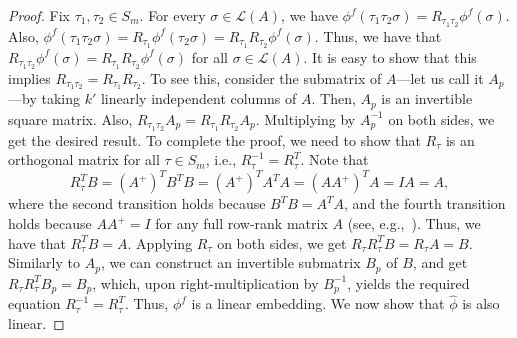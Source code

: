 \documentclass[prodmode,acmec]{ec-acmsmall}
\newcommand{\calL}{{\mathcal{L}}}
\newcommand{\rank}{{\calL(A)}}
\begin{document}
\begin{proof}
Fix $\tau_1,\tau_2 \in S_m$. For every $\sigma \in \rank$, we have $\phi^f(\tau_1 \tau_2 \sigma) = R_{\tau_1 \tau_2} \phi^f(\sigma)$. Also, $\phi^f(\tau_1 \tau_2 \sigma) = R_{\tau_1} \phi^f(\tau_2 \sigma) = R_{\tau_1}R_{\tau_2} \phi^f(\sigma)$. Thus, we have that $R_{\tau_1 \tau_2} \phi^f(\sigma) = R_{\tau_1} R_{\tau_2} \phi^f(\sigma)$ for all $\sigma \in \rank$. It is easy to show that this implies $R_{\tau_1 \tau_2} = R_{\tau_1} R_{\tau_2}$. To see this, consider the submatrix of $A$---let us call it $A_p$---by taking $k'$ linearly independent columns of $A$. Then, $A_p$ is an invertible square matrix. Also, $R_{\tau_1 \tau_2} A_p = R_{\tau_1} R_{\tau_2} A_p$. Multiplying by $A_p^{-1}$ on both sides, we get the desired result. To complete the proof, we need to show that $R_{\tau}$ is an orthogonal matrix for all $\tau \in S_m$, i.e., $R_{\tau}^{-1} = R_{\tau}^T$. Note that 
$$
R_{\tau}^T B = (A^{+})^T B^T B = (A^{+})^T A^T A = (A A^{+})^T A = I A = A,
$$
where the second transition holds because $B^T B = A^T A$, and the fourth transition holds because $A A^{+} = I$ for any full row-rank matrix $A$ (see, e.g.,~\cite{BH12}). Thus, we have that $R_{\tau}^T B = A$. Applying $R_{\tau}$ on both sides, we get $R_{\tau} R_{\tau}^T B = R_{\tau} A = B$. Similarly to $A_p$, we can construct an invertible submatrix $B_p$ of $B$, and get $R_{\tau} R_{\tau}^T B_p = B_p$, which, upon right-multiplication by $B_p^{-1}$, yields the required equation $R_{\tau}^{-1} = R_{\tau}^T$. Thus, $\phi^f$ is a linear embedding. We now show that $\hat{\phi}$ is also linear. 


\end{proof}
\end{document}
